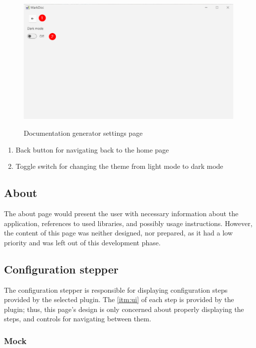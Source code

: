\begin{figure}[H]
    \caption{Documentation generator settings page}
    \includegraphics[width=\linewidth]{img/markDocSettings.png}
    \label{fig:settingsPage}
\end{figure}

\begin{enumerate}
    \item Back button for navigating back to the home page
    \item Toggle switch for changing the theme from light mode to dark mode
\end{enumerate}

\subsection{About}

The about page would present the user with necessary information about the application, references to used libraries, and possibly usage instructions. However, the content of this page was neither designed, nor prepared, as it had a low priority and was left out of this development phase.

\subsection{Configuration stepper}

The configuration stepper is responsible for displaying configuration steps provided by the selected plugin. The \ref{itm:ui} of each step is provided by the plugin; thus, this page's design is only concerned about properly displaying the steps, and controls for navigating between them.

\subsubsection{Mock}

